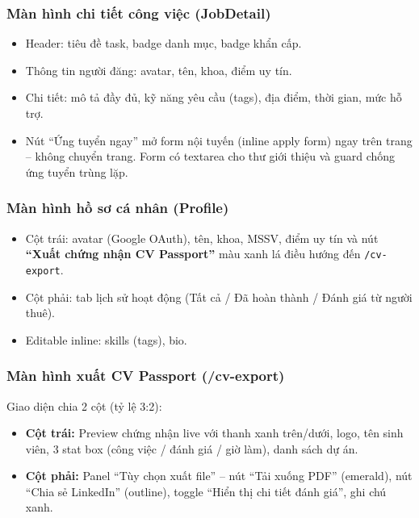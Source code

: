 \subsubsection{Màn hình chi tiết công việc (JobDetail)}

\begin{itemize}
  \item Header: tiêu đề task, badge danh mục, badge khẩn cấp.
  \item Thông tin người đăng: avatar, tên, khoa, điểm uy tín.
  \item Chi tiết: mô tả đầy đủ, kỹ năng yêu cầu (tags), địa điểm, thời gian, mức hỗ trợ.
  \item Nút ``Ứng tuyển ngay'' mở form nội tuyến (inline apply form) ngay trên trang -- không
    chuyển trang. Form có textarea cho thư giới thiệu và guard chống ứng tuyển trùng lặp.
\end{itemize}

\subsubsection{Màn hình hồ sơ cá nhân (Profile)}

\begin{itemize}
  \item Cột trái: avatar (Google OAuth), tên, khoa, MSSV, điểm uy tín và nút
    \textbf{``Xuất chứng nhận CV Passport''} màu xanh lá điều hướng đến \texttt{/cv-export}.
  \item Cột phải: tab lịch sử hoạt động (Tất cả / Đã hoàn thành / Đánh giá từ người thuê).
  \item Editable inline: skills (tags), bio.
\end{itemize}

\subsubsection{Màn hình xuất CV Passport (/cv-export)}

Giao diện chia 2 cột (tỷ lệ 3:2):
\begin{itemize}
  \item \textbf{Cột trái:} Preview chứng nhận live với thanh xanh trên/dưới, logo, tên sinh
    viên, 3 stat box (công việc / đánh giá / giờ làm), danh sách dự án.
  \item \textbf{Cột phải:} Panel ``Tùy chọn xuất file'' -- nút ``Tải xuống PDF'' (emerald),
    nút ``Chia sẻ LinkedIn'' (outline), toggle ``Hiển thị chi tiết đánh giá'', ghi chú xanh.
\end{itemize}


